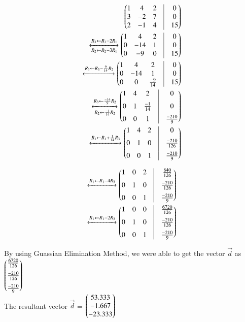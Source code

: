 \documentclass[journal,12pt,twocolumn]{IEEEtran}
\begin{document}
	\begin{align}
		\myvec{
			1 & 4 & 2 & \vrule & 0 \\
			3 & -2 & 7 & \vrule & 0 \\
			2 & -1 & 4 & \vrule & 15 \\
		}
		\\
		\xleftrightarrow[R_2 \leftarrow R_2-3R_1]{R_3 \leftarrow R_3 - 2R_1}
		\myvec{
			1 & 4 & 2 & \vrule & 0 \\
			0 & -14 & 1 & \vrule & 0 \\
			0 & -9 & 0 & \vrule & 15
		}
		\\
		\xleftrightarrow[]{R_3\leftarrow R_3-\frac{9}{14}R_2}
		\myvec{
			1 & 4 & 2 & \vrule & 0 \\
			0 & -14 & 1 & \vrule & 0 \\
			0 & 0 & \frac{-9}{14} & \vrule & 15
		}\\
		\xleftrightarrow[R_2 \leftarrow \frac{-1}{14}R_2]{R_3 \leftarrow \frac{-14}{9}R_2}
		\myvec{
			1 & 4 & 2 & \vrule & 0 \\[0.2cm]
			0 & 1 & \frac{-1}{14} & \vrule & 0 \\[0.2cm]
			0 & 0 & 1 & \vrule & \frac{-210}{9}
		}\\
		\xleftrightarrow[]{R_1 \leftarrow R_1+\frac{1}{14}R_3}
		\myvec{
			1 & 4 & 2 & \vrule & 0 \\[0.2cm]
			0 & 1 & 0 & \vrule & \frac{-210}{126} \\[0.2cm]
			0 & 0 & 1 & \vrule & \frac{-210}{9}
		}
	\end{align}


	\begin{align}
		\xleftrightarrow[]{R_1 \leftarrow R_1-4R_3}
		\myvec{
			1 & 0 & 2 & \vrule & \frac{840}{126} \\[0.2cm]
			0 & 1 & 0 & \vrule & \frac{-210}{126} \\[0.2cm]
			0 & 0 & 1 & \vrule & \frac{-210}{9}
		}\\
		\xleftrightarrow[]{R_1 \leftarrow R_1-2R_3}
		\myvec{
			1 & 0 & 0 & \vrule & \frac{6720}{126} \\[0.2cm]
			0 & 1 & 0 & \vrule & \frac{-210}{126} \\[0.2cm]
			0 & 0 & 1 & \vrule & \frac{-210}{9}
		}
\end{align}


By using Guassian Elimination Method, we were able to get the vector $\vec{d}$ as
	$\begin{pmatrix}\frac{6720}{126} \\[0.2cm]\frac{-210}{126} \\[0.2cm]\frac{-210}{9}\end{pmatrix}$\\[0.5cm]
	
The resultant vector $\vec{d}$ = $\begin{pmatrix}53.333\\-1.667\\-23.333\end{pmatrix}$
    
\end{document}
